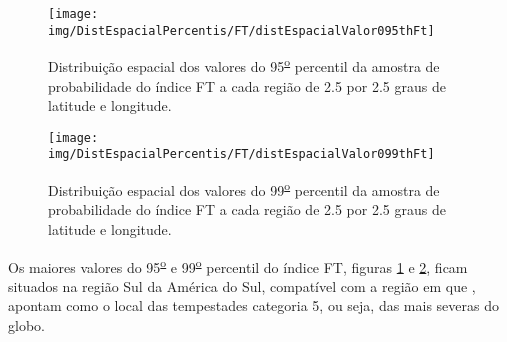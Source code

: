\begin{figure}[!ht]
\centering
{\texttt{[image: img/DistEspacialPercentis/FT/distEspacialValor095thFt]}} 
\caption{Distribuição espacial dos valores do 95\textsuperscript{\underline{o}} percentil da amostra de probabilidade do índice FT a cada região de 2.5 por 2.5 graus de latitude e longitude.}
\label{95oFt}
\end{figure} 
  
\begin{figure}[!ht]
\centering  
{\texttt{[image: img/DistEspacialPercentis/FT/distEspacialValor099thFt]}}
\caption{Distribuição espacial dos valores do  99\textsuperscript{\underline{o}} percentil da amostra de probabilidade do índice FT a cada região de 2.5 por 2.5 graus de latitude e longitude.}
\label{99oFt}
\end{figure}

Os maiores valores do 95\textsuperscript{\underline{o}} e 99\textsuperscript{\underline{o}} percentil do índice FT, figuras \ref{95oFt} e \ref{99oFt},  ficam situados na região Sul da América do Sul, compatível com a região em que , apontam como o local das tempestades categoria 5, ou seja, das mais severas do globo.